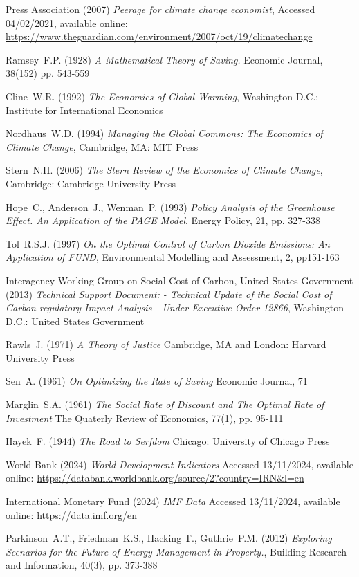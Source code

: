 \documentclass[11pt, oneside]{article}   	%
\begin{document}
\begin{thebibliography}{99}
 Press Association (2007)
\emph{Peerage for climate change economist},
Accessed 04/02/2021, available online: 
\url{https://www.theguardian.com/environment/2007/oct/19/climatechange}

 Ramsey~F.P. (1928)
\emph{A Mathematical Theory of Saving.}
Economic Journal, 38(152) pp. 543-559

 Cline~W.R. (1992)
\emph{The Economics of Global Warming},
Washington D.C.: Institute for International Economics
		
 Nordhaus~W.D. (1994)
\emph{Managing the Global Commons: The Economics of Climate Change},
Cambridge, MA: MIT Press
	
 Stern~N.H. (2006)
\emph{The Stern Review of the Economics of Climate Change},
Cambridge: Cambridge University Press
		
 Hope~C., Anderson~J., Wenman~P. (1993)
\emph{Policy Analysis of the Greenhouse Effect. An Application of the PAGE Model},
Energy Policy, 21, pp. 327-338
		
 Tol~R.S.J. (1997)
\emph{On the Optimal Control of Carbon Dioxide Emissions: An Application of FUND},
Environmental Modelling and Assessment, 2, pp151-163

 Interagency Working Group on Social Cost of Carbon, United States Government (2013)
\emph{Technical Support Document: - Technical Update of the Social Cost of Carbon regulatory Impact Analysis - Under Executive Order 12866},
Washington D.C.: United States Government

 Rawls~J. (1971)
\emph{A Theory of Justice}
Cambridge, MA and London: Harvard University Press

 Sen~A. (1961)
\emph{On Optimizing the Rate of Saving}
Economic Journal, 71
		
 Marglin~S.A. (1961)
\emph{The Social Rate of Discount and The Optimal Rate of Investment}
The Quaterly Review of Economics, 77(1), pp. 95-111

 Hayek~F. (1944)
\emph{The Road to Serfdom}
Chicago: University of Chicago Press

 World Bank (2024)
\emph{World Development Indicators}
Accessed 13/11/2024, available online: 
\url{https://databank.worldbank.org/source/2?country=IRN&l=en}

 International Monetary Fund (2024)
\emph{IMF Data}
Accessed 13/11/2024, available online: 
\url{https://data.imf.org/en}

 Parkinson~A.T., Friedman~K.S., Hacking T., Guthrie~P.M. (2012)
\emph{Exploring Scenarios for the Future of Energy Management in Property.},
Building Research and Information, 40(3), pp. 373-388
	
\end{thebibliography}
\end{document}
